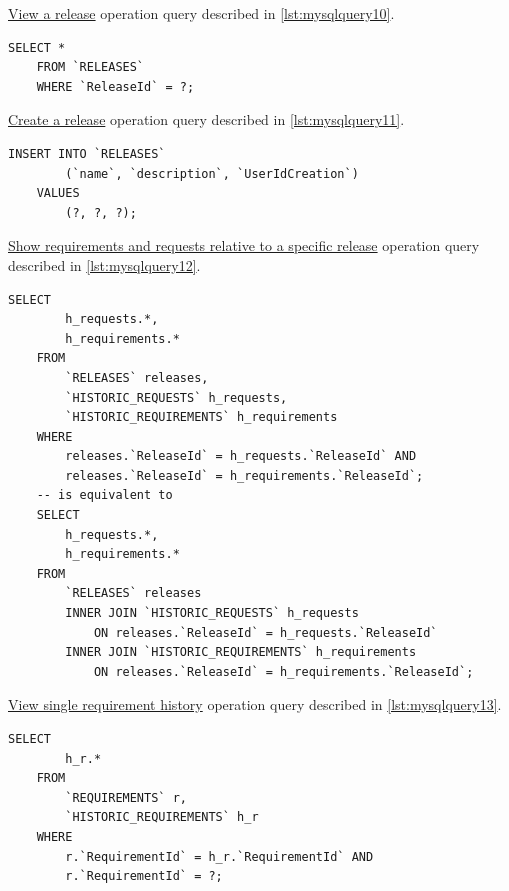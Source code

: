 \documentclass[12pt, a4paper]{report}
\begin{document}
\hyperref[subsubsec:op10]{View a release} operation query described in \autoref{lst:mysqlquery10}.

\begin{lstlisting}[language=MySQL, caption={\texorpdfstring{\hyperref[subsubsec:op10]{op. 10}}{op. 10}}, label={lst:mysqlquery10}]
    SELECT *
    FROM `RELEASES`
    WHERE `ReleaseId` = ?;
\end{lstlisting}

\hyperref[subsubsec:op11]{Create a release} operation query described in \autoref{lst:mysqlquery11}.

\begin{lstlisting}[language=MySQL, caption={\texorpdfstring{\hyperref[subsubsec:op11]{op. 11}}{op. 11}}, label={lst:mysqlquery11}]
    INSERT INTO `RELEASES`
        (`name`, `description`, `UserIdCreation`)
    VALUES
        (?, ?, ?);
\end{lstlisting}

\hyperref[subsubsec:op12]{Show requirements and requests relative to a specific release} operation query described in
\autoref{lst:mysqlquery12}.

\begin{lstlisting}[language=MySQL, caption={\texorpdfstring{\hyperref[subsubsec:op12]{op. 12}}{op. 12}}, label={lst:mysqlquery12}]
    SELECT
        h_requests.*,
        h_requirements.*
    FROM
        `RELEASES` releases,
        `HISTORIC_REQUESTS` h_requests,
        `HISTORIC_REQUIREMENTS` h_requirements
    WHERE
        releases.`ReleaseId` = h_requests.`ReleaseId` AND
        releases.`ReleaseId` = h_requirements.`ReleaseId`;
    -- is equivalent to
    SELECT
        h_requests.*,
        h_requirements.*
    FROM
        `RELEASES` releases
        INNER JOIN `HISTORIC_REQUESTS` h_requests
            ON releases.`ReleaseId` = h_requests.`ReleaseId`
        INNER JOIN `HISTORIC_REQUIREMENTS` h_requirements
            ON releases.`ReleaseId` = h_requirements.`ReleaseId`;
\end{lstlisting}

\hyperref[subsubsec:op13]{View single requirement history} operation query described in \autoref{lst:mysqlquery13}.

\begin{lstlisting}[language=MySQL, caption={\texorpdfstring{\hyperref[subsubsec:op13]{op. 13}}{op. 13}}, label={lst:mysqlquery13}]
    SELECT
        h_r.*
    FROM
        `REQUIREMENTS` r,
        `HISTORIC_REQUIREMENTS` h_r
    WHERE
        r.`RequirementId` = h_r.`RequirementId` AND
        r.`RequirementId` = ?;
\end{lstlisting}
\end{document}
